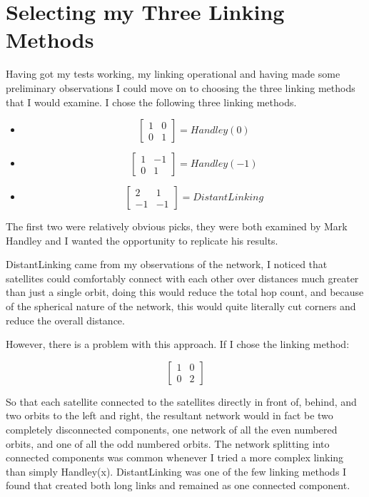 \documentclass[12pt,a4paper,twoside,openright]{report}
\begin{document}

\section{Selecting my Three Linking Methods}

Having got my tests working, my linking operational and having made some preliminary observations I could move on to choosing the three linking methods that I would examine. I chose the following three linking methods.

\begin{itemize}
\item
\[\begin{bmatrix} 
1 & 0 \\
0 & 1 
\end{bmatrix} = Handley(0)\]
\item
\[\begin{bmatrix} 
1 & -1 \\
0 & 1 
\end{bmatrix} = Handley(-1)\]
\item
\[\begin{bmatrix} 
2 & 1 \\
-1 & -1 
\end{bmatrix} = DistantLinking\]
\end{itemize}

The first two were relatively obvious picks, they were both examined by Mark Handley and I wanted the opportunity to replicate his results.

DistantLinking came from my observations of the network, I noticed that satellites could comfortably connect with each other over distances much greater than just a single orbit, doing this would reduce the total hop count, and because of the spherical nature of the network, this would quite literally cut corners and reduce the overall distance.

However, there is a problem with this approach. If I chose the linking method: 

\[\begin{bmatrix} 
1 & 0 \\
0 & 2 
\end{bmatrix} \]

So that each satellite connected to the satellites directly in front of, behind, and two orbits to the left and right, the resultant network would in fact be two completely disconnected components, one network of all the even numbered orbits, and one of all the odd numbered orbits. The network splitting into connected components was common whenever I tried a more complex linking than simply Handley(x). DistantLinking was one of the few linking methods I found that created both long links and remained as one connected component.
\end{document}

